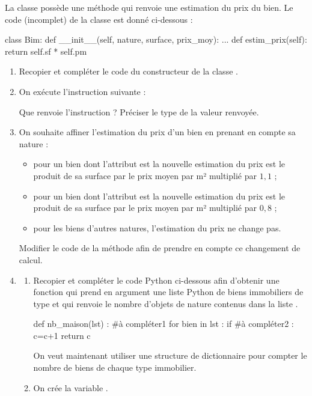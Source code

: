\documentclass[11pt,a4paper,french,twoside]{PMCours}
\begin{document}
La classe  possède une méthode  qui renvoie une estimation du prix du
bien. Le code (incomplet) de la classe  est donné ci-dessous :
\begin{Python*}
class Bim:
    def __init__(self, nature, surface, prix_moy):
        ...
    def estim_prix(self):
        return self.sf * self.pm
\end{Python*}

\begin{enumerate}
\item Recopier et compléter le code du constructeur de la classe .
\item On exécute l'instruction suivante :

\medskip
{}

Que renvoie l'instruction  ? Préciser le type de la valeur renvoyée.
\item On souhaite affiner l'estimation du prix d'un bien en prenant en compte sa nature :
\begin{itemize}
\item pour un bien dont l'attribut  est  la nouvelle estimation du prix est le
produit de sa surface par le prix moyen par m² multiplié par $1,\!1$ ;
\item pour un bien dont l'attribut  est  la nouvelle estimation du prix est le
produit de sa surface par le prix moyen par m² multiplié par $0,\!8$ ;
\item pour les biens d'autres natures, l'estimation du prix ne change pas.
\end{itemize}
Modifier le code de la méthode  afin de prendre en compte ce changement
de calcul.
\item 
\begin{enumerate} 
\item Recopier et compléter le code Python ci-dessous afin d'obtenir une fonction  qui prend en argument une liste Python de biens immobiliers de type  et qui renvoie le nombre d'objets de nature  contenus dans la liste .
\begin{Python}
def nb_maison(lst) : 
	#à compléter1
	for bien in lst : 
		if #à compléter2 :
			c=c+1
	return c
\end{Python}
On veut maintenant utiliser une structure de dictionnaire pour compter le nombre de biens de chaque type immobilier.
\item On crée la variable .\\

\end{enumerate}
\end{enumerate}
\end{document}
